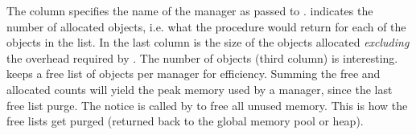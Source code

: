 The  column specifies the name of the manager as
passed to .   indicates the
number of allocated objects, i.e. what the procedure 
 would return for each of the objects in
the list.  In the last column is the size of the
objects allocated {\em excluding} the overhead required by
.
The number of  objects (third column) is interesting.
 keeps a free list of objects per manager for
efficiency.
Summing the free and allocated counts will yield the peak memory
used by a manager, since the last free list purge.  The
notice  is called by 
 to free all unused memory.  This is how the
free lists get purged (returned back to the global memory pool or
heap).
